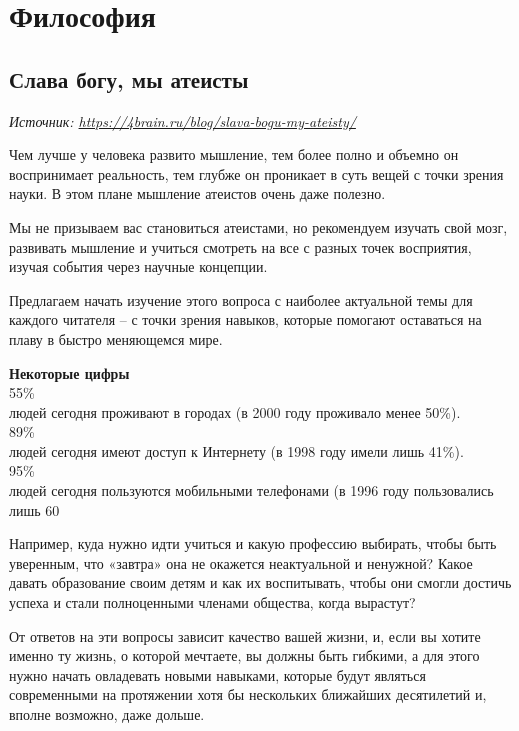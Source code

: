 \chapter{Философия}

\section{Слава богу, мы атеисты}

\textit{Источник: \url{https://4brain.ru/blog/slava-bogu-my-ateisty/}}

Чем лучше у человека развито мышление, тем более полно и объемно он воспринимает реальность, тем глубже он проникает в суть вещей с точки зрения науки. В этом плане мышление атеистов очень даже полезно.

Мы не призываем вас становиться атеистами, но рекомендуем изучать свой мозг, развивать мышление и учиться смотреть на все с разных точек восприятия, изучая события через научные концепции.

Предлагаем начать изучение этого вопроса с наиболее актуальной темы для каждого читателя – с точки зрения навыков, которые помогают оставаться на плаву в быстро меняющемся мире.

\begin{fancyquotes}
    \textbf{Некоторые цифры}\\

    {\Huge 55\%}\\
    людей сегодня проживают в городах (в 2000 году проживало менее 50\%).\\[1em]

    {\Huge 89\%}\\
    людей сегодня имеют доступ к Интернету (в 1998 году имели лишь 41\%).\\[1em]

    {\Huge 95\%}\\
    людей сегодня пользуются мобильными телефонами (в 1996 году пользовались лишь 60%

\end{fancyquotes}

Например, куда нужно идти учиться и какую профессию выбирать, чтобы быть уверенным, что «завтра» она не окажется неактуальной и ненужной? Какое давать образование своим детям и как их воспитывать, чтобы они смогли достичь успеха и стали полноценными членами общества, когда вырастут?

От ответов на эти вопросы зависит качество вашей жизни, и, если вы хотите именно ту жизнь, о которой мечтаете, вы должны быть гибкими, а для этого нужно начать овладевать новыми навыками, которые будут являться современными на протяжении хотя бы нескольких ближайших десятилетий и, вполне возможно, даже дольше.